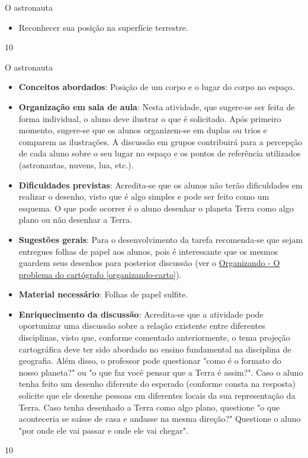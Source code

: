 {\vspace{2em}
\begin{objectives}{O astronauta}
{
\begin{itemize}
\item Reconhecer sua posição na superfície terrestre.

\end{itemize}
}
{1}{0}
\end{objectives}
\begin{sugestions}{O astronauta}
{
  \begin{itemize}
  \item \textbf{Conceitos abordados}: Posição de um corpo e o  lugar do corpo no espaço.
  
  \item \textbf{Organização em sala de aula}: Nesta atividade, que sugere-se ser feita de forma individual, o aluno deve ilustrar o que é solicitado. Após primeiro momento, sugere-se que os alunos organizem-se em duplas ou trios e comparem as ilustrações. A discussão em grupos contribuirá para a percepção de cada aluno sobre o seu lugar no espaço e os pontos de referência utilizados (astronautas, nuvens, lua, etc.).
  \item \textbf{Dificuldades previstas}: Acredita-se que os alunos não terão dificuldades em realizar o desenho, visto que é algo simples e pode ser feito como um esquema. O que pode ocorrer é o aluno desenhar o planeta Terra como algo plano ou não desenhar a Terra.
  \item \textbf{Sugestões gerais}: Para o desenvolvimento da tarefa recomenda-se que sejam entregues folhas de papel aos alunos, pois é interessante que os mesmos guardem seus desenhos para posterior discussão (ver o  \hyperref[organizando-carto]{Organizando - O problema do cartógrafo \ref{organizando-carto}}).
  \item \textbf{Material necessário}: Folhas de papel sulfite.
  \item \textbf{Enriquecimento da discussão}: Acredita-se que a atividade pode oportunizar uma discussão sobre a relação existente entre diferentes disciplinas, visto que, conforme comentado anteriormente, o tema projeção cartográfica deve ter sido abordado no ensino fundamental na disciplina de geografia. Além disso, o professor pode questionar "como é o formato do nosso planeta?" ou "o que faz você pensar que a Terra é assim?". Caso o aluno tenha feito um desenho diferente do esperado (conforme consta na resposta) solicite que ele desenhe pessoas em diferentes locais da sua representação da Terra. Caso tenha desenhado a Terra como algo plano, questione "o que aconteceria se saísse de casa e andasse na mesma direção?" Questione o aluno "por onde ele vai passar e onde ele vai chegar".
  \end{itemize}
}{1}{0}
\end{sugestions}}
